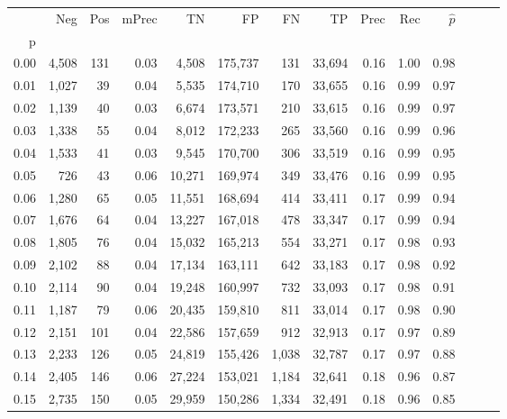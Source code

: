 \begin{tabular}{rrrrrrrrrrrrrr}
\toprule
{} &    Neg &  Pos & mPrec &       TN &       FP &      FN &      TP &  Prec &   Rec & $\hat{p}$ \\
p    &        &      &       &          &          &         &         &       &       &           \\
\midrule
0.00 &  4,508 &  131 &  0.03 &    4,508 &  175,737 &     131 &  33,694 &  0.16 &  1.00 &      0.98 \\
0.01 &  1,027 &   39 &  0.04 &    5,535 &  174,710 &     170 &  33,655 &  0.16 &  0.99 &      0.97 \\
0.02 &  1,139 &   40 &  0.03 &    6,674 &  173,571 &     210 &  33,615 &  0.16 &  0.99 &      0.97 \\
0.03 &  1,338 &   55 &  0.04 &    8,012 &  172,233 &     265 &  33,560 &  0.16 &  0.99 &      0.96 \\
0.04 &  1,533 &   41 &  0.03 &    9,545 &  170,700 &     306 &  33,519 &  0.16 &  0.99 &      0.95 \\
0.05 &    726 &   43 &  0.06 &   10,271 &  169,974 &     349 &  33,476 &  0.16 &  0.99 &      0.95 \\
0.06 &  1,280 &   65 &  0.05 &   11,551 &  168,694 &     414 &  33,411 &  0.17 &  0.99 &      0.94 \\
0.07 &  1,676 &   64 &  0.04 &   13,227 &  167,018 &     478 &  33,347 &  0.17 &  0.99 &      0.94 \\
0.08 &  1,805 &   76 &  0.04 &   15,032 &  165,213 &     554 &  33,271 &  0.17 &  0.98 &      0.93 \\
0.09 &  2,102 &   88 &  0.04 &   17,134 &  163,111 &     642 &  33,183 &  0.17 &  0.98 &      0.92 \\
0.10 &  2,114 &   90 &  0.04 &   19,248 &  160,997 &     732 &  33,093 &  0.17 &  0.98 &      0.91 \\
0.11 &  1,187 &   79 &  0.06 &   20,435 &  159,810 &     811 &  33,014 &  0.17 &  0.98 &      0.90 \\
0.12 &  2,151 &  101 &  0.04 &   22,586 &  157,659 &     912 &  32,913 &  0.17 &  0.97 &      0.89 \\
0.13 &  2,233 &  126 &  0.05 &   24,819 &  155,426 &   1,038 &  32,787 &  0.17 &  0.97 &      0.88 \\
0.14 &  2,405 &  146 &  0.06 &   27,224 &  153,021 &   1,184 &  32,641 &  0.18 &  0.96 &      0.87 \\
0.15 &  2,735 &  150 &  0.05 &   29,959 &  150,286 &   1,334 &  32,491 &  0.18 &  0.96 &      0.85 \\

\end{tabular}
